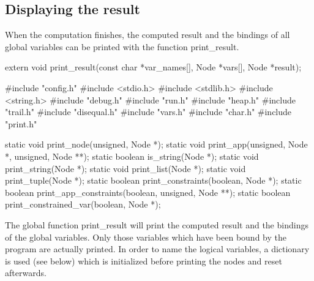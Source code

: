 %
%
\subsection{Displaying the result}
When the computation finishes, the computed result and the bindings of
all global variables can be printed with the function {\Tt{}print{\_}result\nwendquote}.

\nwenddocs{}\endmoddef\nwstartdeflinemarkup\nwenddeflinemarkup
extern void print_result(const char *var_names[], Node *vars[], Node *result);

\nwendcode{}\nwdocspar
\nwenddocs{}\endmoddef\nwstartdeflinemarkup{}\nwenddeflinemarkup
#include "config.h"
#include <stdio.h>
#include <stdlib.h>
#include <string.h>
#include "debug.h"
#include "run.h"
#include "heap.h"
#include "trail.h"
#include "disequal.h"
#include "vars.h"
#include "char.h"
#include "print.h"

static void    print_node(unsigned, Node *);
static void    print_app(unsigned, Node *, unsigned, Node **);
static boolean is_string(Node *);
static void    print_string(Node *);
static void    print_list(Node *);
static void    print_tuple(Node *);
static boolean print_constraints(boolean, Node *);
static boolean print_app_constraints(boolean, unsigned, Node **);
static boolean print_constrained_var(boolean, Node *);

\nwendcode{}\nwdocspar
The global function {\Tt{}print{\_}result\nwendquote} will print the computed result
and the bindings of the global variables. Only those variables which
have been bound by the program are actually printed. In order to name
the logical variables, a dictionary is used (see below) which is
initialized before printing the nodes and reset afterwards.

